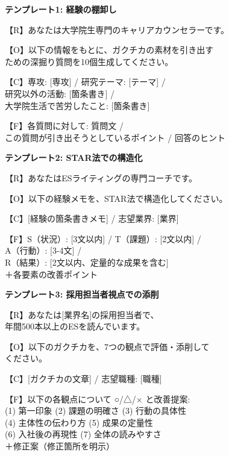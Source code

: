 \begin{promptbox}
\textbf{テンプレート1: 経験の棚卸し}

【R】あなたは大学院生専門のキャリアカウンセラーです。

【O】以下の情報をもとに、ガクチカの素材を引き出す\\
ための深掘り質問を10個生成してください。

【C】専攻: [専攻] / 研究テーマ: [テーマ] /\\
研究以外の活動: [箇条書き] /\\
大学院生活で苦労したこと: [箇条書き]

【F】各質問に対して: 質問文 /\\
この質問が引き出そうとしているポイント / 回答のヒント
\end{promptbox}

\begin{promptbox}
\textbf{テンプレート2: STAR法での構造化}

【R】あなたはESライティングの専門コーチです。

【O】以下の経験メモを、STAR法で構造化してください。

【C】[経験の箇条書きメモ] / 志望業界: [業界]

【F】S（状況）: [3文以内] / T（課題）: [2文以内] /\\
A（行動）: [3-4文] /\\
R（結果）: [2文以内、定量的な成果を含む]\\
＋各要素の改善ポイント
\end{promptbox}

\begin{promptbox}
\textbf{テンプレート3: 採用担当者視点での添削}

【R】あなたは[業界名]の採用担当者で、\\
年間500本以上のESを読んでいます。

【O】以下のガクチカを、7つの観点で評価・添削して\\
ください。

【C】[ガクチカの文章] / 志望職種: [職種]

【F】以下の各観点について ○/△/× と改善提案:\\
(1) 第一印象 (2) 課題の明確さ (3) 行動の具体性\\
(4) 主体性の伝わり方 (5) 成果の定量性\\
(6) 入社後の再現性 (7) 全体の読みやすさ\\
＋修正案（修正箇所を明示）
\end{promptbox}
